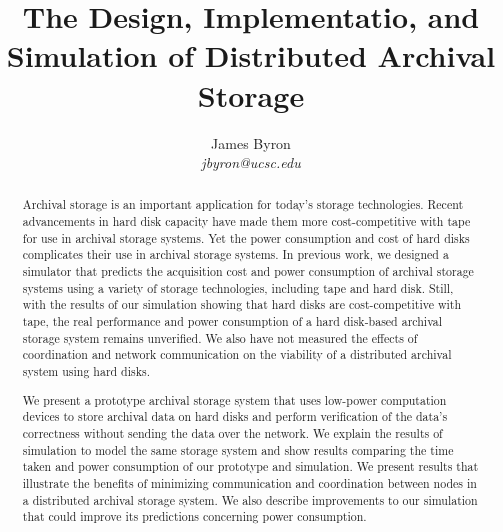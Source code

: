 \documentclass[10pt,twocolumn]{article}
\begin{document}
\title{The Design, Implementatio, and Simulation of Distributed Archival Storage}

\author{
{\rm James Byron} \\
\textit{jbyron@ucsc.edu}
}

\maketitle

\begin{abstract}
Archival storage is an important application for today's storage technologies.  Recent advancements in hard disk capacity have made them more cost-competitive with tape for use in archival storage systems.  Yet the power consumption and cost of hard disks complicates their use in archival storage systems.  In previous work, we designed a simulator that predicts the acquisition cost and power consumption of archival storage systems using a variety of storage technologies, including tape and hard disk.  Still, with the results of our simulation showing that hard disks are cost-competitive with tape, the real performance and power consumption of a hard disk-based archival storage system remains unverified.  We also have not measured the effects of coordination and network communication on the viability of a distributed archival system using hard disks.

We present a prototype archival storage system that uses low-power computation devices to store archival data on hard disks and perform verification of the data's correctness without sending the data over the network.  We explain the results of simulation to model the same storage system and show results comparing the time taken and power consumption of our prototype and simulation.  We present results that illustrate the benefits of minimizing communication and coordination between nodes in a distributed archival storage system.  We also describe improvements to our simulation that could improve its predictions concerning power consumption.

\end{abstract}





\end{document}
